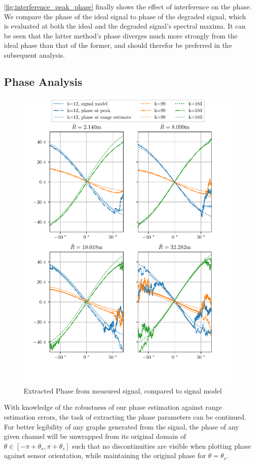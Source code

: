 \cref{fig:interference_peak_phase} finally shows the effect of interference on the phase.
We compare the phase of the ideal signal to phase of the degraded signal,
which is evaluated at both the ideal and the degraded signal's spectral maxima.
It can be seen that the latter method's phase diverges much more strongly from the ideal phase than that of the former,
and should therefor be preferred in the subsequent analysis. \\

\newpage
\subsection{Phase Analysis}
\label{sec:phase_analysis}
\begin{figure}
  \centering
  \includegraphics[width=\textwidth]{../figures/phase_estimates.pdf}
  \caption{Extracted Phase from measured signal, compared to signal model}
  \label{fig:measured_peak_phase}
\end{figure}
With knowledge of the robustness of our phase estimation against range estimation errors,
the task of extracting the phase parameters can be continued.
For better legibility of any graphs generated from the signal,
the phase of any given channel will be unwrapped from its original domain of $\theta \in [-\pi+\theta_s, \pi+\theta_s]$ such that no discontinuities
are visible when plotting phase against sensor orientation, while maintaining the original phase for $\theta = \theta_s$.

